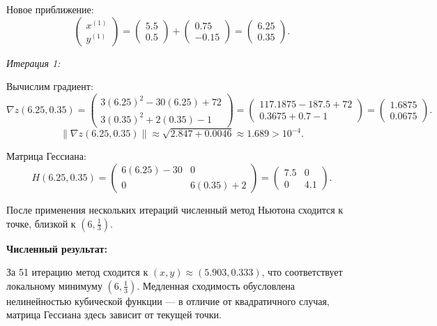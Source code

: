 \documentclass[12pt,a4paper]{article}
\begin{document}
Новое приближение:
\[
\begin{pmatrix} x^{(1)} \\ y^{(1)} \end{pmatrix}
= \begin{pmatrix} 5.5 \\ 0.5 \end{pmatrix}
+ \begin{pmatrix} 0.75 \\ -0.15 \end{pmatrix}
= \begin{pmatrix} 6.25 \\ 0.35 \end{pmatrix}.
\]

\textit{Итерация 1:}

Вычислим градиент:
\[
\nabla z(6.25, 0.35) =
\begin{pmatrix}
3(6.25)^2 - 30(6.25) + 72 \\
3(0.35)^2 + 2(0.35) - 1
\end{pmatrix}
= \begin{pmatrix}
117.1875 - 187.5 + 72 \\
0.3675 + 0.7 - 1
\end{pmatrix}
= \begin{pmatrix}
1.6875 \\
0.0675
\end{pmatrix}.
\]
\[
\|\nabla z(6.25, 0.35)\| \approx \sqrt{2.847 + 0.0046} \approx 1.689 > 10^{-4}.
\]

Матрица Гессиана:
\[
H(6.25, 0.35) = \begin{pmatrix} 6(6.25) - 30 & 0 \\ 0 & 6(0.35) + 2 \end{pmatrix}
= \begin{pmatrix} 7.5 & 0 \\ 0 & 4.1 \end{pmatrix}.
\]

После применения нескольких итераций численный метод Ньютона сходится к точке, близкой к $(6, \frac{1}{3})$.

\textbf{Численный результат:}

За 51 итерацию метод сходится к $(x, y) \approx (5.903, 0.333)$, что соответствует локальному минимуму $(6, \frac{1}{3})$. Медленная сходимость обусловлена нелинейностью кубической функции — в отличие от квадратичного случая, матрица Гессиана здесь зависит от текущей точки.
\end{document}
